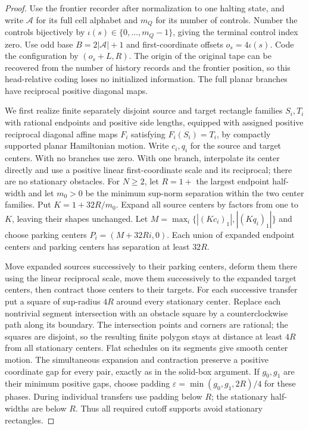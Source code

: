 \begin{proof}\label{bc:guarded-planar-event-proof}
Use the frontier recorder after normalization to one halting state, and
write $\mathcal A$ for its full cell alphabet and $m_Q$ for its number
of controls. Number the controls bijectively by
$\iota(s)\in\{0,\ldots,m_Q-1\}$, giving the terminal control index zero.
Use odd base $B=2|\mathcal A|+1$ and first-coordinate offsets
$o_s=4\iota(s)$. Code the
configuration by $(o_s+L,R)$. The origin of the original tape can be
recovered from the number of history records and the frontier position,
so this head-relative coding loses no initialized information.
The full planar branches have reciprocal positive diagonal maps.

We first realize finite separately disjoint source and target rectangle
families $S_i,T_i$ with rational endpoints and positive side lengths,
equipped with assigned positive
reciprocal diagonal affine maps $F_i$ satisfying $F_i(S_i)=T_i$, by
compactly supported planar Hamiltonian motion. Write $c_i,q_i$ for the
source and target centers. With no
branches use zero. With one branch, interpolate its center directly and
use a positive linear first-coordinate scale and its reciprocal; there
are no stationary obstacles. For $N\ge2$, let $R=1+$ the largest endpoint
half-width and let $m_0>0$ be the minimum sup-norm separation within the
two center families. Put $K=1+32R/m_0$. Expand all source centers by
factors from one to $K$, leaving their shapes unchanged. Let
$M=\max_i\{|(Kc_i)_1|,|(Kq_i)_1|\}$ and choose parking centers
$P_i=(M+32Ri,0)$. Each union of expanded endpoint centers and parking
centers has separation at least $32R$.

Move expanded sources successively to their parking centers, deform them
there using the linear reciprocal scale, move them successively to the
expanded target centers, then contract those centers to their targets.
For each successive transfer put a square of sup-radius $4R$ around
every stationary center. Replace each nontrivial segment intersection
with an obstacle square by a counterclockwise path along its boundary.
The intersection points and corners are rational; the squares are disjoint,
so the resulting finite polygon stays at distance at least $4R$ from
all stationary centers. Flat schedules on its segments give smooth center
motion. The simultaneous expansion and contraction preserve a positive
coordinate gap for every pair, exactly as in the solid-box argument.
If $g_0,g_1$ are their minimum positive gaps, choose padding
$\varepsilon=\min(g_0,g_1,2R)/4$ for these phases. During individual
transfers use padding below $R$; the stationary half-widths are below $R$.
Thus all required cutoff supports avoid stationary rectangles.


\end{proof}
